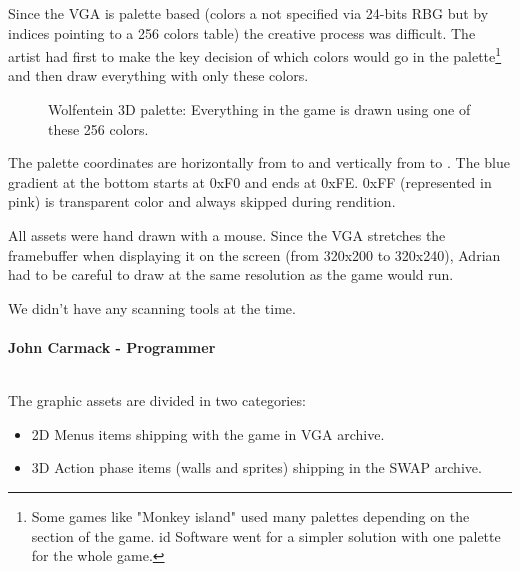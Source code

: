 \documentclass[book.tex]{subfiles}
\begin{document}
\par
Since the VGA is palette based (colors a not specified via 24-bits RBG but by indices pointing to a 256 colors table) the creative process was difficult. The artist had first to make the key decision of which colors would go in the palette\footnote{Some games like "Monkey island" used many palettes depending on the section of the game. id Software went for a simpler solution with one palette for the whole game.} and then draw everything with only these colors.\\
\begin{figure}[H]
  \centering
{}
 \caption{Wolfentein 3D palette: Everything in the game is drawn using one of these 256 colors.}
\end{figure}
The palette coordinates are horizontally from  to  and vertically from  to . The blue gradient at the bottom starts at 0xF0 and ends at 0xFE. 0xFF (represented in pink) is transparent color and always skipped during rendition.\\
\par

All assets were hand drawn with a mouse. Since the VGA stretches the framebuffer when displaying it on the screen (from 320x200 to 320x240), Adrian had to be careful to draw at the same resolution as the game would run.\\
\par
\begin{fancyquotes}
We didn't have any scanning tools at the time.\\
\\
\textbf{John Carmack - Programmer}
\end{fancyquotes}
\\
The graphic assets are divided in two categories:
\begin{itemize}
\item 2D Menus items shipping with the game in VGA archive.
\item 3D Action phase items (walls and sprites) shipping in the SWAP archive.
\end{itemize}
\end{document}
